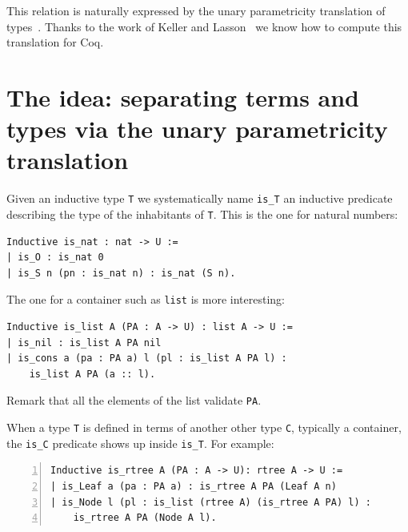 \documentclass[sigplan,10pt,review]{acmart}\settopmatter{printfolios=true,printccs=false,printacmref=false}
\begin{document}
This relation is naturally expressed by the unary parametricity
translation of types~\cite{Wadler:1989:TF:99370.99404}.
Thanks to the work of Keller and
Lasson~\cite{keller:hal-00730913} we know how to
compute this translation for Coq.


\section{The idea: separating terms and types via the unary parametricity translation}
\label{sec:idea}

Given an inductive type \lstinline+T+ we systematically name \lstinline+is_T+
an inductive predicate describing the type of the inhabitants of
\lstinline+T+. This is the one for natural numbers:

\begin{minipage}{\textwidth}\begin{lstlisting}
Inductive is_nat : nat -> U :=
| is_O : is_nat 0
| is_S n (pn : is_nat n) : is_nat (S n).
\end{lstlisting}\end{minipage}

\noindent
The one for a container such as \lstinline+list+ is more interesting:

\begin{minipage}{\textwidth}\begin{lstlisting}
Inductive is_list A (PA : A -> U) : list A -> U :=
| is_nil : is_list A PA nil
| is_cons a (pa : PA a) l (pl : is_list A PA l) :
    is_list A PA (a :: l).
\end{lstlisting}\end{minipage}

\noindent
Remark that all the elements of the list validate \lstinline+PA+.

When a type \lstinline+T+ is defined in terms of another other type
\lstinline+C+, typically a container, the \lstinline+is_C+ predicate
shows up inside \lstinline+is_T+. For example:

\begin{minipage}{\textwidth}\begin{lstlisting}[numbers=left]
Inductive is_rtree A (PA : A -> U): rtree A -> U :=
| is_Leaf a (pa : PA a) : is_rtree A PA (Leaf A n)
| is_Node l (pl : is_list (rtree A) (is_rtree A PA) l) :
    is_rtree A PA (Node A l).
\end{lstlisting}\end{minipage}
\end{document}
